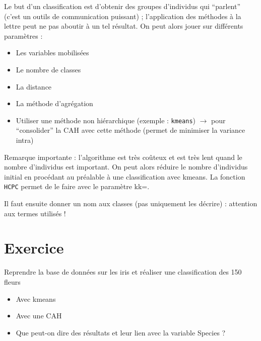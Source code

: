 \documentclass[]{book}
\providecommand{\tightlist}{%
  \setlength{\itemsep}{0pt}\setlength{\parskip}{0pt}}
\begin{document}
Le but d'un classification est d'obtenir des groupes d'individus qui ``parlent'' (c'est un outils de communication puissant) ; l'application des méthodes à la lettre peut ne pas aboutir à un tel résultat. On peut alors jouer sur différents paramètres :

\begin{itemize}
\tightlist
\item
  Les variables mobilisées
\item
  Le nombre de classes
\item
  La distance
\item
  La méthode d'agrégation
\item
  Utiliser une méthode non hiérarchique (exemple : \texttt{kmeans}) \(\rightarrow\) pour ``consolider'' la CAH avec cette méthode (permet de minimiser la variance intra)
\end{itemize}

Remarque importante : l'algorithme est très coûteux et est très lent quand le nombre d'individus est important. On peut alors réduire le nombre d'individus initial en procédant au préalable à une classification avec kmeans. La fonction \texttt{HCPC} permet de le faire avec le paramètre kk=.

Il faut ensuite donner un nom aux classes (pas uniquement les décrire) : attention aux termes utilisés !

\hypertarget{exercice-3}{%
\section{Exercice}\label{exercice-3}}

Reprendre la base de données sur les iris et réaliser une classification des 150 fleurs

\begin{itemize}
\tightlist
\item
  Avec kmeans
\item
  Avec une CAH
\item
  Que peut-on dire des résultats et leur lien avec la variable Species ?
\end{itemize}
\end{document}
